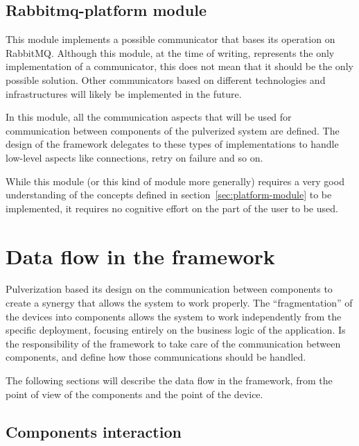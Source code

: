 \subsection{Rabbitmq-platform module}
\label{sec:rabbitmq-platform-module}

This module implements a possible communicator that bases its operation on RabbitMQ. Although this module, at the time of writing, represents
the only implementation of a communicator, this does not mean that it should be the only possible solution.
Other communicators based on different technologies and infrastructures will likely be implemented in the future.

In this module, all the communication aspects that will be used for communication between components of the pulverized system are defined.
The design of the framework delegates to these types of implementations to handle low-level aspects like connections, retry on failure and so on.

While this module (or this kind of module more generally) requires a very good understanding of the concepts defined in
section~\ref{sec:platform-module} to be implemented, it requires no cognitive effort on the part of the user to be used.


\section{Data flow in the framework}
\label{sec:framework-data-flow}

Pulverization based its design on the communication between components to create a synergy that allows the system to work properly.
The ``fragmentation'' of the devices into components allows the system to work independently from the specific deployment, focusing entirely on
the business logic of the application.
Is the responsibility of the framework to take care of the communication between components, and define how those communications should be handled.

The following sections will describe the data flow in the framework, from the point of view of the components and the point of the device.

\subsection{Components interaction}
\label{sec:framework-components-interaction}

